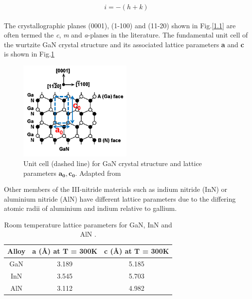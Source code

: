 \begin{equation}
 i = -(h+k)
 \end{equation}
\\
 
The crystallographic planes (0001), (1-100) and (11-20) shown in Fig.\ref{1.1} are often termed the {\it c}, {\it m} and {\it a}-planes in the literature. The fundamental unit cell of the wurtzite GaN crystal structure and its associated lattice parameters \textbf{a} and \textbf{c} is shown in Fig.\ref{1.2}

\begin{figure}[h]
	\centering
	\includegraphics[width=0.5\textwidth]{Figs/Ch1/unit_cell.png}
	\caption {Unit cell (dashed line) for GaN crystal structure and lattice parameters $\mathbf{a_{0}},\mathbf{c_{0}}$. Adapted from \cite{Yu1999}}
	\label{1.2}
\end{figure}
\FloatBarrier

Other members of the III-nitride materials such as indium nitride  (InN) or aluminium nitride  (AlN) have different lattice parameters due to the differing atomic radii of aluminium and indium relative to gallium.

\begin{table}[!htb]
	\centering
	\label{tab1.1}
	\begin{tabular}{ccc}
		Alloy & \textbf{a} (\si{\angstrom}) at T = 300K & \textbf{c} (\si{\angstrom}) at T = 300K \\
		\hline\hline
		GaN   & 3.189   & 5.185   \\
		InN   & 3.545   & 5.703   \\
		AlN   & 3.112  & 4.982  \\ 
		\hline
	\end{tabular}
	\caption{Room temperature lattice parameters for GaN, InN and AlN \cite{Vurgaftman2003}.}
\end{table}

